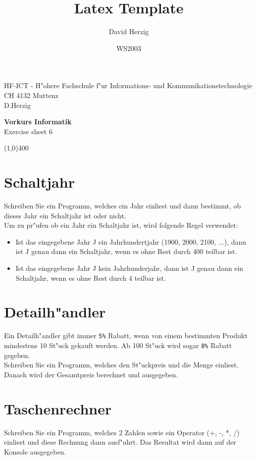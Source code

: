 \documentclass[a4paper,10pt]{article}
\title{Latex Template}
\author{David Herzig}
\date{WS2003}
\begin{document}
HF-ICT - H"ohere Fachschule f"ur Informations- und Kommunikationstechnologie\\
CH 4132 Muttenz\\
D.Herzig

\vspace{2mm}

\begin{center}
{\Large \bf Vorkurs Informatik}\\
Exercise sheet 6
\end{center}

\vspace{2mm}

\line(1,0){400}

\vspace{5mm}

\section{Schaltjahr}
Schreiben Sie ein Programm, welches ein Jahr einliest und dann bestimmt, ob dieses
Jahr ein Schaltjahr ist oder nicht.\\
Um zu pr"ufen ob ein Jahr ein Schaltjahr ist, wird folgende Regel verwendet:
\begin{itemize}
\item Ist das eingegebene Jahr J ein Jahrhundertjahr (1900, 2000, 2100, ...), dann ist J genau dann ein Schaltjahr,
wenn es ohne Rest durch 400 teilbar ist.
\item Ist das eingegebene Jahr J kein Jahrhunderjahr, dann ist J genau dann ein Schaltjahr, wenn es ohne Rest
durch 4 teilbar ist.
\end{itemize}

\section{Detailh"andler}
Ein Detailh"andler gibt immer \verb|5%| Rabatt, wenn von einem bestimmten Produkt mindestens 10 St"uck gekauft
werden. Ab 100 St"uck wird sogar \verb|8%| Rabatt gegeben.\\
Schreiben Sie ein Programm, welches den St"uckpreis und die Menge einliest. Danach wird der Gesamtpreis berechnet
und ausgegeben.

\section{Taschenrechner}
Schreiben Sie ein Programm, welches 2 Zahlen sowie ein Operator (+, -, *, /) einliest und diese Rechnung dann ausf"uhrt.
Das Resultat wird dann auf der Konsole ausgegeben.\\
\end{document}
